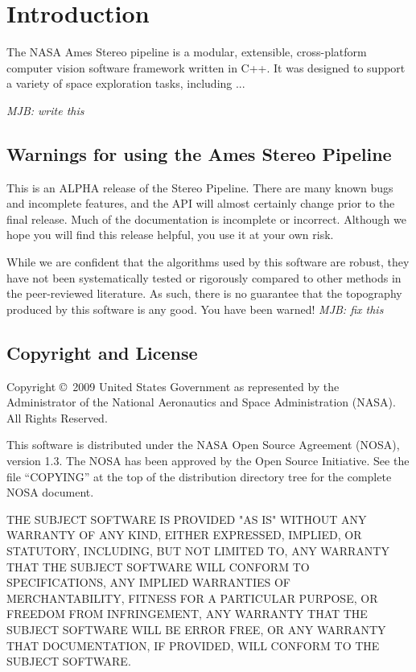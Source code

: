 \chapter{Introduction}

The NASA Ames Stereo pipeline is a modular, extensible, cross-platform
computer vision software framework written in C++.  It was designed to
support a variety of space exploration tasks, including ...

\emph{MJB: write this}


\section{Warnings for using the Ames Stereo Pipeline}

This is an ALPHA release of the Stereo Pipeline.  There are many
known bugs and incomplete features, and the API will almost certainly
change prior to the final release.  Much of the documentation is
incomplete or incorrect.  Although we hope you will find this release
helpful, you use it at your own risk.

While we are confident that the algorithms used by this software
are robust, they have not been systematically tested or rigorously
compared to other methods in the peer-reviewed literature.  As such,
there is no guarantee that the topography produced by this software 
is any good.  You have been warned! \emph{MJB: fix this}

\section{Copyright and License}

Copyright \copyright\ 2009 United States Government as represented by the
Administrator of the National Aeronautics and Space Administration
(NASA).  All Rights Reserved.

This software is distributed under the NASA Open Source Agreement
(NOSA), version 1.3.  The NOSA has been approved by the Open Source
Initiative.  See the file ``COPYING'' at the top of the distribution
directory tree for the complete NOSA document.

THE SUBJECT SOFTWARE IS PROVIDED "AS IS" WITHOUT ANY WARRANTY OF ANY
KIND, EITHER EXPRESSED, IMPLIED, OR STATUTORY, INCLUDING, BUT NOT
LIMITED TO, ANY WARRANTY THAT THE SUBJECT SOFTWARE WILL CONFORM TO
SPECIFICATIONS, ANY IMPLIED WARRANTIES OF MERCHANTABILITY, FITNESS FOR
A PARTICULAR PURPOSE, OR FREEDOM FROM INFRINGEMENT, ANY WARRANTY THAT
THE SUBJECT SOFTWARE WILL BE ERROR FREE, OR ANY WARRANTY THAT
DOCUMENTATION, IF PROVIDED, WILL CONFORM TO THE SUBJECT SOFTWARE.

